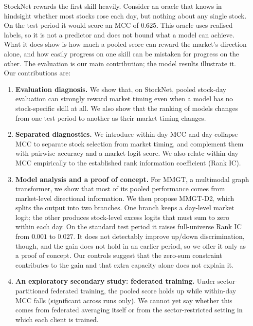 \documentclass[conference]{IEEEtran}
\begin{document}
StockNet rewards the first skill heavily. Consider an oracle that knows in hindsight
whether most stocks rose each day, but nothing about any single stock. On the test
period it would score an MCC of $0.625$. This oracle uses realised labels, so it is not
a predictor and does not bound what a model can achieve. What it does show is how much
a pooled score can reward the market's direction alone, and how easily progress on one
skill can be mistaken for progress on the other. The evaluation is our main
contribution; the model results illustrate it. Our contributions are:
\begin{enumerate}
\item \textbf{Evaluation diagnosis.} We show that, on StockNet, pooled stock-day
evaluation can strongly reward market timing even when a model has no stock-specific
skill at all. We also show that the ranking of models changes from one test period to
another as their market timing changes.
\item \textbf{Separated diagnostics.} We introduce within-day MCC and day-collapse MCC
to separate stock selection from market timing, and complement them with pairwise
accuracy and a market-logit score. We also relate within-day MCC empirically to the
established rank information coefficient (Rank IC).
\item \textbf{Model analysis and a proof of concept.} For MMGT, a multimodal graph
transformer, we show that most of its pooled performance comes from market-level
directional information. We then propose MMGT-D2, which splits the output into two
branches. One branch keeps a day-level market logit; the other produces stock-level
excess logits that must sum to zero within each day. On the standard test period it
raises full-universe Rank IC from $0.001$ to $0.027$. It does not detectably improve
up/down discrimination, though, and the gain does not hold in an earlier period, so we
offer it only as a proof of concept. Our controls suggest that the zero-sum constraint
contributes to the gain and that extra capacity alone does not explain it.
\item \textbf{An exploratory secondary study: federated training.} Under
sector-partitioned federated training, the pooled score holds up while within-day MCC
falls (significant across runs only). We cannot yet say whether this comes from
federated averaging itself or from the sector-restricted setting in which each client
is trained.
\end{enumerate}

\end{document}
